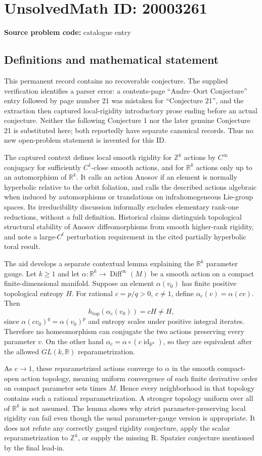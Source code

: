 \documentclass[11pt]{article}
\newcommand{\Z}{\mathbb{Z}}
\newcommand{\R}{\mathbb{R}}
\begin{document}
\section*{UnsolvedMath ID: 20003261}
\textbf{Source problem code:} catalogue entry
\subsection{Definitions and mathematical statement}
This permanent record contains no recoverable conjecture. The supplied verification identifies a parser error: a contents-page ``Andre--Oort Conjecture'' entry followed by page number 21 was mistaken for ``Conjecture 21'', and the extraction then captured local-rigidity introductory prose ending before an actual conjecture. Neither the following Conjecture 1 nor the later genuine Conjecture 21 is substituted here; both reportedly have separate canonical records. Thus no new open-problem statement is invented for this ID.

The captured context defines local smooth rigidity for $\Z^k$ actions by $C^\infty$ conjugacy for sufficiently $C^1$-close smooth actions, and for $\R^k$ actions only up to an automorphism of $\R^k$. It calls an action Anosov if an element is normally hyperbolic relative to the orbit foliation, and calls the described actions algebraic when induced by automorphisms or translations on infrahomogeneous Lie-group spaces. Its irreducibility discussion informally excludes elementary rank-one reductions, without a full definition. Historical claims distinguish topological structural stability of Anosov diffeomorphisms from smooth higher-rank rigidity, and note a large-$C^\ell$ perturbation requirement in the cited partially hyperbolic toral result.

The aid develops a separate contextual lemma explaining the $\R^k$ parameter gauge. Let $k\geq1$ and let $\alpha:\R^k\to\operatorname{Diff}^\infty(M)$ be a smooth action on a compact finite-dimensional manifold. Suppose an element $\alpha(v_0)$ has finite positive topological entropy $H$. For rational $c=p/q>0$, $c\ne1$, define $\alpha_c(v)=\alpha(cv)$. Then
\[
h_{\mathrm{top}}(\alpha_c(v_0))=cH\ne H,
\]
since $\alpha(cv_0)^q=\alpha(v_0)^p$ and entropy scales under positive integral iterates. Therefore no homeomorphism can conjugate the two actions preserving every parameter $v$. On the other hand $\alpha_c=\alpha\circ(c\operatorname{id}_{\R^k})$, so they are equivalent after the allowed $GL(k,\R)$ reparametrization.

As $c\to1$, these reparametrized actions converge to $\alpha$ in the smooth compact-open action topology, meaning uniform convergence of each finite derivative order on compact parameter sets times $M$. Hence every neighborhood in that topology contains such a rational reparametrization. A stronger topology uniform over all of $\R^k$ is not assumed. The lemma shows why strict parameter-preserving local rigidity can fail even though the usual parameter-gauge version is appropriate. It does not refute any correctly gauged rigidity conjecture, apply the scalar reparametrization to $\Z^k$, or supply the missing R. Spatzier conjecture mentioned by the final lead-in.
\end{document}
